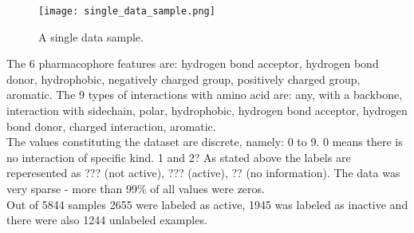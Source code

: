 \documentclass[a4paper,10pt]{report}
\begin{document}
	\begin{figure}[h!]
	  \centering
	  \texttt{[image: single\_data\_sample.png]}
	  \caption{A single data sample.}
	  \label{fig:single_data_sample2}
	\end{figure} 
	
	The 6 pharmacophore features are: hydrogen bond acceptor, hydrogen bond donor, hydrophobic, negatively charged group, positively charged group, aromatic. The 9 types of interactions with amino acid are: any, with a backbone, interaction with sidechain, polar, hydrophobic, hydrogen bond acceptor, hydrogen bond donor, charged interaction, aromatic. \\
	
	The values constituting the dataset are discrete, namely: 0 to 9. 0 means there is no interaction of specific kind. 1 and 2? As stated above the labels are reperesented as ??? (not active), ??? (active), ?? (no information). The data was very sparse - more than 99\% of all values were zeros.\\
	
	
	Out of 5844 samples 2655 were labeled as active, 1945 was labeled as inactive and there were also 1244 unlabeled examples.\\
	

	    
           
	    
\end{document}
